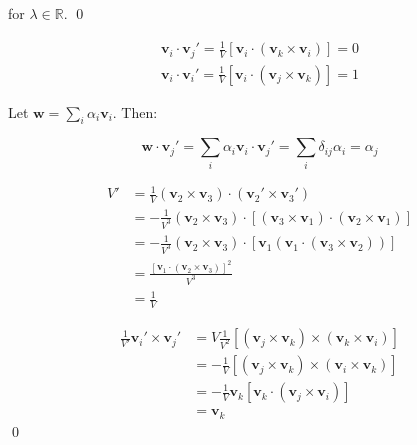 \documentclass[12pt]{article}
\begin{document}
for $\lambda \in \mathbb{R}$.
\qed




\begin{equation}
    \begin{split}
        \mathbf{v}_{i} \cdot \mathbf{v}_{j}' = \frac{1}{V} [\mathbf{v}_{i} \cdot (\mathbf{v}_{k} \times \mathbf{v}_{i})] = 0 \\
        \mathbf{v}_{i} \cdot \mathbf{v}_{i}' = \frac{1}{V} [\mathbf{v}_{i} \cdot (\mathbf{v}_{j} \times \mathbf{v}_{k})] = 1
    \end{split}
\end{equation}

Let $\mathbf{w} = \sum_{i} \alpha_{i} \mathbf{v}_{i}$. Then:

\begin{equation}
    \mathbf{w} \cdot \mathbf{v}_{j}' = \sum_{i} \alpha_{i} \mathbf{v}_{i} \cdot \mathbf{v}_{j}' = \sum_{i} \delta_{ij} \alpha_{i} = \alpha_{j}
\end{equation}


\begin{equation}
    \begin{split}
        V' &= \frac{1}{V} (\mathbf{v}_{2} \times \mathbf{v}_{3}) \cdot (\mathbf{v}_{2}' \times \mathbf{v}_{3}') \\
        &= - \frac{1}{V^{3}} (\mathbf{v}_{2} \times \mathbf{v}_{3}) \cdot \left[ (\mathbf{v}_{3} \times \mathbf{v}_{1}) \cdot (\mathbf{v}_{2} \times \mathbf{v}_{1}) \right] \\
        &= - \frac{1}{V^{3}} (\mathbf{v}_{2} \times \mathbf{v}_{3}) \cdot \left[\mathbf{v}_{1} (\mathbf{v}_{1} \cdot (\mathbf{v}_{3} \times \mathbf{v}_{2})) \right] \\
        &= \frac{\left[ \mathbf{v}_{1} \cdot (\mathbf{v}_{2} \times \mathbf{v}_{3}) \right]^{2}}{V^{3}} \\
        &= \frac{1}{V}
    \end{split}
\end{equation}


\begin{equation}
    \begin{split}
        \frac{1}{V'} \mathbf{v}_{i}' \times \mathbf{v}_{j}' &= V \frac{1}{V^{2}} \left[ (\mathbf{v}_{j} \times \mathbf{v}_{k}) \times (\mathbf{v}_{k} \times \mathbf{v}_{i}) \right] \\
        &= -\frac{1}{V} \left[ (\mathbf{v}_{j} \times \mathbf{v}_{k}) \times (\mathbf{v}_{i} \times \mathbf{v}_{k}) \right] \\
        &= -\frac{1}{V} \mathbf{v}_{k} \left[ \mathbf{v}_{k} \cdot (\mathbf{v}_{j} \times \mathbf{v}_{i}) \right] \\
        &= \mathbf{v}_{k}
    \end{split}
\end{equation}
\qed
\end{document}
